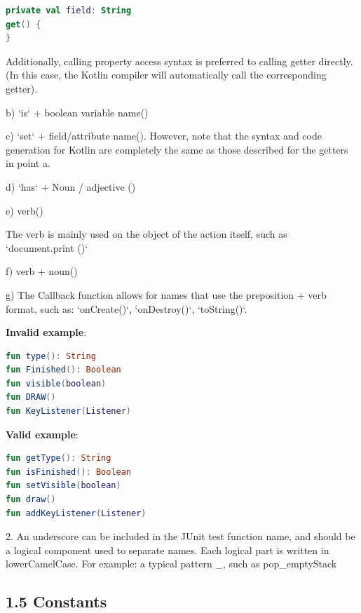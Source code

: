 \begin{lstlisting}[language=Kotlin]
private val field: String
get() {
}
\end{lstlisting}
Additionally, calling property access syntax is preferred to calling getter directly. (In this case, the Kotlin compiler will automatically call the corresponding getter).



b) `is` + boolean variable name()



c) `set` + field/attribute name(). However, note that the syntax and code generation for Kotlin are completely the same as those described for the getters in point a.



d) `has` + Noun / adjective ()



e) verb()

The verb is mainly used on the object of the action itself, such as `document.print ()`



f) verb + noun()



g) The Callback function allows for names that use the preposition + verb format, such as: `onCreate()`, `onDestroy()`, `toString()`.



\textbf{Invalid example}:



\begin{lstlisting}[language=Kotlin]
fun type(): String
fun Finished(): Boolean
fun visible(boolean)
fun DRAW()
fun KeyListener(Listener)
\end{lstlisting}


\textbf{Valid example}:



\begin{lstlisting}[language=Kotlin]
fun getType(): String
fun isFinished(): Boolean
fun setVisible(boolean)
fun draw()
fun addKeyListener(Listener)
\end{lstlisting}


2.	An underscore can be included in the JUnit test function name, and should be a logical component used to separate names. Each logical part is written in lowerCamelCase. For example: a typical pattern \_, such as pop\_emptyStack



\subsection*{\textbf{1.5 Constants}}

